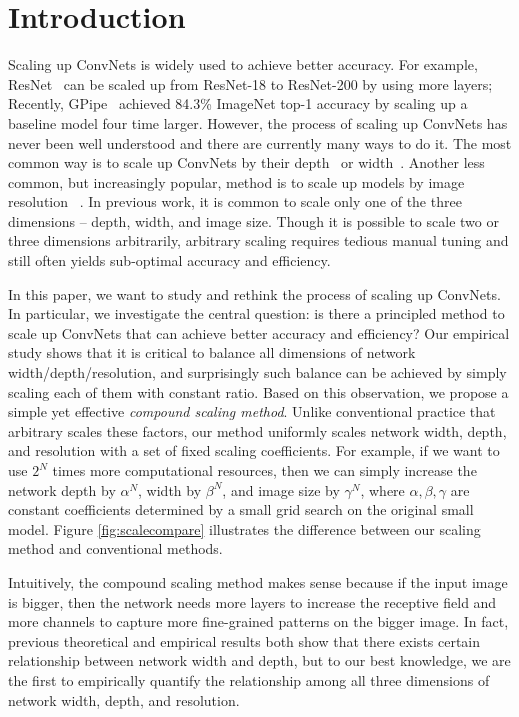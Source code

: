 \documentclass{article}
\begin{document}
 \section{Introduction}
Scaling up ConvNets is widely used to achieve better accuracy. For example, ResNet~\cite{resnet16} can be scaled up from
ResNet-18 to ResNet-200 by using more layers;  Recently, GPipe~\cite{gpipe18} achieved 84.3\% ImageNet top-1 accuracy by scaling up a baseline model four time larger. 
However, the process of  scaling up ConvNets has never been well understood and there are currently many ways to do it. The most common way is to scale up ConvNets by their depth~\cite{resnet16} or width~\cite{wideresnet16}. Another less common, but increasingly popular, method is to scale up models by image resolution ~\cite{gpipe18}.  In previous work, it is common to scale only one of the three dimensions -- depth, width, and image size. Though it is possible to scale  two or three dimensions  arbitrarily, arbitrary scaling requires tedious manual tuning and still often yields sub-optimal accuracy and efficiency.      
 

In this paper, we want to study and rethink the process of scaling up ConvNets. In particular, we investigate the central question: is there a principled method to scale up ConvNets that can achieve better accuracy and efficiency? 
Our empirical study shows that it is critical to  balance all dimensions of network width/depth/resolution, and surprisingly such balance can be achieved by simply scaling each of them with constant ratio. Based on this observation, we propose a simple yet effective \emph{compound scaling method}.  Unlike conventional practice that arbitrary scales  these factors, our method uniformly scales  network width, depth, and resolution with a set of fixed scaling coefficients. For example, if we want to use $2^N$ times more computational resources, then we can simply increase the network depth by $\alpha ^ N$,  width by $\beta ^ N$, and image size by $\gamma ^ N$, where $\alpha, \beta, \gamma$ are constant coefficients determined by a small grid search on the original small model. Figure \ref{fig:scalecompare} illustrates the difference between our  scaling method and conventional methods.


Intuitively, the compound scaling method makes sense because if the input image is bigger, then the network needs more layers to increase the receptive field and more channels to capture more fine-grained patterns on the bigger image. In fact, previous theoretical  \cite{expressdepth17,expresswidth18} and empirical results \cite{wideresnet16} both show that there exists certain relationship between network width and depth, but to our best knowledge, we are the first to empirically quantify the relationship among all three dimensions of network width, depth, and resolution.
\end{document}
